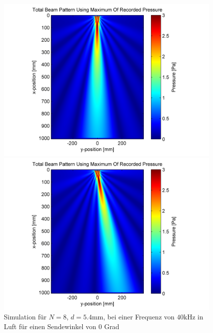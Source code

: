 \begin{figure}[hb]
\begin{minipage}{0.5\textwidth}
\begin{center}
\includegraphics[width=1.2\textwidth]{graphics/image_grundlagen_sim_0_degrees.png}
\end{center}
\caption{Simulation für $N = 8$, $d = 5.4 \mathrm{mm}$, bei einer Frequenz von $40 \mathrm{kHz}$ in Luft für einen Sendewinkel von 0 Grad} %
\label{fig:image_grundlagen_sim_0_degrees}
%
\end{minipage}
\begin{minipage}{0.5\textwidth}
\begin{center}
\includegraphics[width=1.2\textwidth]{graphics/image_grundlagen_sim_10_degrees.png}

\end{center}
\end{minipage}
\end{figure}
